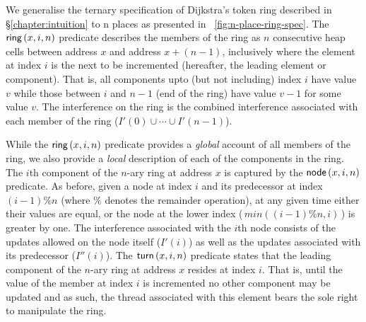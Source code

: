 We generalise the ternary specification of Dijkstra's token ring described in \S\ref{chapter:intuition} to n places as presented in \fig~\ref{fig:n-place-ring-spec}. The $\textsf{ring}\left(x,i, n\right)$ predicate describes the members of the ring as $n$ consecutive heap cells between address $x$ and address $x + (n-1)$, inclusively where the element at index $i$ is the next to be incremented (hereafter, the leading element or component). That is, all components upto (but not including) index $i$ have value $v$ while those between $i$ and $n-1$ (end of the ring) have value $v-1$ for some value $v$. The interference on the ring is the combined interference associated with each member of the ring ($I'(0) \cup \cdots \cup I'(n-1)$). 

While the $\textsf{ring}\left(x,i, n\right)$ predicate provides a \emph{global} account of all members of the ring, we also provide a \emph{local} description of each of the components in the ring. The $i$th component of the $n$-ary ring at address $x$ is captured by the $\textsf{node}\left(x,i,n\right)$ predicate. As before, given a node at index $i$ and its predecessor at index $(i-1)\%n$ (where $\%$ denotes the remainder operation), at any given time either their values are equal, or the node at the lower index (\,$min((i-1)\%n, i)$\,) is greater by one. The interference associated with the $i$th node consists of the updates allowed on the node itself ($I'(i)$) as well as the updates associated with its predecessor ($I''(i)$). The $\textsf{turn}\left(x,i,n\right)$ predicate states that the leading component of the $n$-ary ring at address $x$ resides at index $i$. That is, until the value of the member at index $i$ is incremented no other component may be updated and as such, the thread associated with this element bears the sole right to manipulate the ring.

